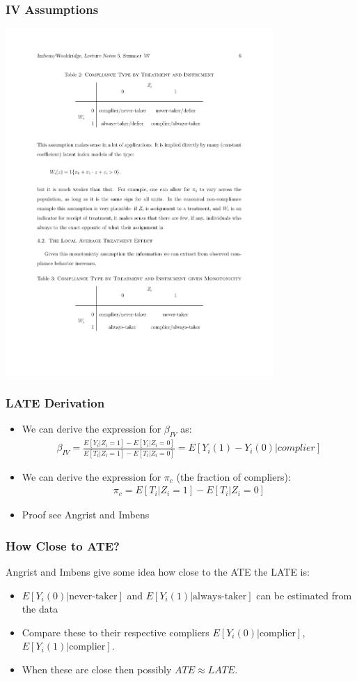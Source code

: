 \documentclass[xcolor=pdftex,dvipsnames,table,mathserif,aspectratio=169]{beamer}
\begin{document}
\begin{frame}
\frametitle{IV Assumptions}
\includegraphics[width=4in]{./resources/imbens3.pdf}
\end{frame}

\begin{frame}
\frametitle{LATE Derivation}
\begin{itemize}
\item We can derive the expression for $\beta_{IV}$ as:
\begin{eqnarray*}
\beta_{IV} = \frac{E[Y_i  | Z_i = 1] - E[Y_i | Z_i = 0] }{E[T_i | Z_i=1 ] - E[T_i | Z_i = 0]} = E[Y_i(1) - Y_i(0) | complier]
\end{eqnarray*}
\item We can derive the expression for $\pi_c$ (the fraction of compliers):
\begin{eqnarray*}
\pi_c = E[T_i | Z_i = 1] - E[T_i | Z_i =0] 
\end{eqnarray*}
\item Proof see Angrist and Imbens
\end{itemize}
\end{frame}

\begin{frame}
\frametitle{How Close to ATE?}
Angrist and Imbens give some idea how close to the ATE the LATE is:
\begin{itemize}
\item $E[Y_i(0) | \text{never-taker}]$ and  $E[Y_i(1) | \text{always-taker}]$ can be estimated from the data
\item Compare these to their respective compliers $E[Y_i(0) | \text{complier}]$, $E[Y_i(1) | \text{complier}]$.
\item When these are close then possibly $ATE \approx LATE$.
\end{itemize}
\end{frame}
\end{document}
